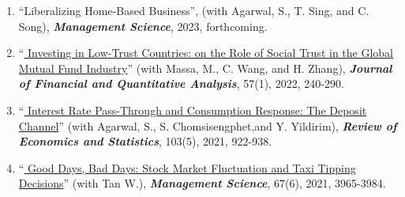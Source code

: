 \documentclass[margin,line]{res}
\begin{document}
\begin{resume}
\begin{enumerate}
\item ``Liberalizing Home-Based Business'', (with Agarwal, S., T. Sing, and C. Song), \textbf{\emph{Management Science}}, 2023, forthcoming.	
\vspace*{0.2cm} 	
\item ``\href{https://jfqa.org/2020/04/28/investing-in-low-trust-countries-on-the-role-of-social-trust-in-the-global-mutual-fund-industry/}{\color{black}  Investing in Low-Trust Countries: on the Role of Social Trust in the Global Mutual Fund Industry}'' (with Massa, M., C. Wang, and H. Zhang), \textbf{\emph{Journal of Financial and Quantitative Analysis}}, 57(1), 2022, 240-290.
	\vspace*{0.2cm}
\item ``\href{https://www.mitpressjournals.org/doi/abs/10.1162/rest_a_00941?mobileUi=0}{\color{black}  Interest Rate Pass-Through and Consumption Response: The Deposit Channel}'' (with Agarwal, S., S. Chomsisengphet,and Y. Yildirim), \textbf{\emph{Review of Economics and Statistics}}, 103(5), 2021, 922-938.
\vspace*{0.2cm}	
\item %
 ``\href{https://pubsonline.informs.org/doi/10.1287/mnsc.2019.3557}{\color{black}  Good Days, Bad Days: Stock Market Fluctuation and Taxi Tipping Decisions}'' (with Tan W.), \textbf{\emph{Management Science}}, 67(6), 2021, 3965-3984.
\vspace*{0.2cm}



\end{enumerate}
\end{resume}
\end{document}
